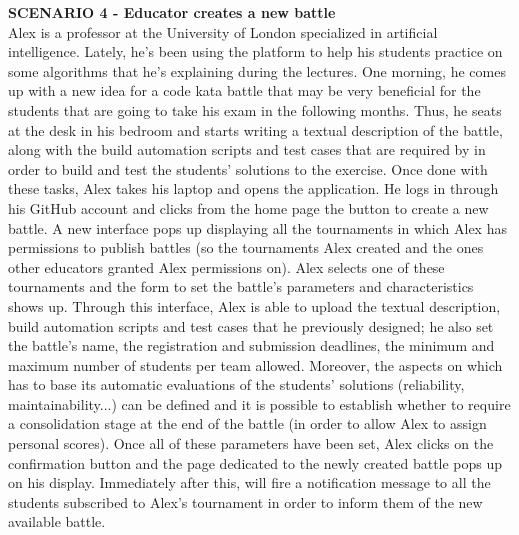     \textbf{SCENARIO 4 - Educator creates a new battle}\\
    Alex is a professor at the University of London specialized in artificial intelligence. Lately, he's been using the \app platform to help his students practice on some algorithms that he's explaining during the lectures. One morning, he comes up with a new idea for a code kata battle that may be very beneficial for the students that are going to take his exam in the following months. Thus, he seats at the desk in his bedroom and starts writing a textual description of the battle, along with the build automation scripts and test cases that are required by \app in order to build and test the students' solutions to the exercise. Once done with these tasks, Alex takes his laptop and opens the \app application. He logs in through his GitHub account and clicks from the home page the button to create a new battle. A new interface pops up displaying all the tournaments in which Alex has permissions to publish battles (so the tournaments Alex created and the ones other educators granted Alex permissions on). Alex selects one of these tournaments and the form to set the battle's parameters and characteristics shows up. Through this interface, Alex is able to upload the textual description, build automation scripts and test cases that he previously designed; he also set the battle's name, the registration and submission deadlines, the minimum and maximum number of students per team allowed. Moreover, the aspects on which \app has to base its automatic evaluations of the students' solutions (reliability, maintainability...) can be defined and it is possible to establish whether to require a consolidation stage at the end of the battle (in order to allow Alex to assign personal scores).
    Once all of these parameters have been set, Alex clicks on the confirmation button and the page dedicated to the newly created battle pops up on his display.
    Immediately after this, \app will fire a notification message to all the students subscribed to Alex's tournament in order to inform them of the new available battle.\\

